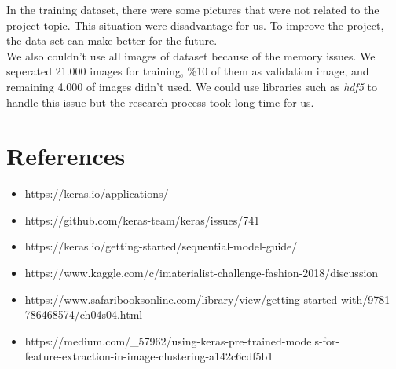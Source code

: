 \documentclass[12pt]{article}
\begin{document}
In the training dataset, there were some pictures that were not related to the project topic. This situation were disadvantage for us. To improve the project, the data set can make better for the future.\\

We also couldn't use all images of dataset because of the memory issues. We seperated 21.000 images for training, \%10 of them as validation image, and remaining 4.000 of images didn't used. We could use libraries such as \textit{hdf5} to handle this issue but the research process took long time for us.  


\section{References}

\begin{itemize}
\item {https://keras.io/applications/}
\item {https://github.com/keras-team/keras/issues/741}
\item {https://keras.io/getting-started/sequential-model-guide/}
\item {https://www.kaggle.com/c/imaterialist-challenge-fashion-2018/discussion}
\item {https://www.safaribooksonline.com/library/view/getting-started with/9781\\786468574/ch04s04.html}
\item {https://medium.com/\_57962/using-keras-pre-trained-models-for-\\feature-extraction-in-image-clustering-a142c6cdf5b1}
\end{itemize}
\end{document}
